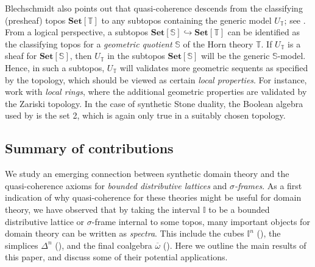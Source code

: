 \documentclass[a4paper,12pt]{amsart}
\theoremstyle{definition}
\newcommand{\mb}[1]{\mathbf{#1}}
\newcommand{\mbb}[1]{\mathbb{#1}}
\newcommand{\T}{\mbb T}
\newcommand{\I}{\mbb I}
\newcommand{\Set}{\mb{Set}}
\newcommand{\ov}[1]{\overline{#1}}
\newcommand{\hook}{\hookrightarrow}
\begin{document}
Blechschmidt also points out that quasi-coherence descends from the classifying (presheaf) topos $\Set[\T]$ to any subtopos containing the generic model $U_\T$; see \citet[Cor. 7.7]{blechschmidt2020general}. From a logical perspective, a subtopos $\Set[\mbb S] \hook \Set[\T]$ can be identified as the classifying topos for a \emph{geometric quotient} $\mbb S$ of the Horn theory $\T$. If $U_\T$ is a sheaf for $\Set[\mbb S]$, then $U_\T$ in the subtopos $\Set[\mbb S]$ will be the generic $\mbb S$-model.
Hence, in such a subtopos, $U_\T$ will validates more geometric sequents as specified by the topology, which should be viewed as certain \emph{local properties}. For instance, \citet{blechschmidt2021using,Cherubini_Coquand_Hutzler_2024} work with \emph{local rings}, where the additional geometric properties are validated by the Zariski topology.
In the case of synthetic Stone duality, the Boolean algebra used by \citet{cherubini2024foundation} is the set 2, which is again only true in a suitably chosen topology.

\subsection{Summary of contributions}\label{sec:contributions}

We study an emerging connection between synthetic domain theory and the quasi-coherence axioms for \emph{bounded distributive lattices} and \emph{$\sigma$-frames}. As a first indication of why quasi-coherence for these theories might be useful for domain theory, we have observed that by taking the interval $\I$ to be a bounded distributive lattice or $\sigma$-frame internal to some topos,
many important objects for domain theory can be written as \emph{spectra}. This include the cubes $\I^n$ (), the simplices $\Delta^n$ (), and the final coalgebra $\ov\omega$ (). Here we outline the main results of this paper, and discuss some of their potential applications.
\end{document}
